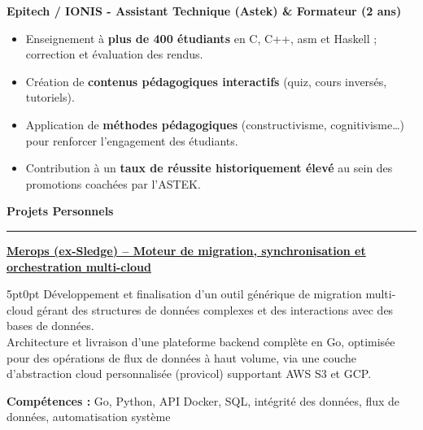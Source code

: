 \documentclass[9pt]{extarticle}
\begin{document}
\par\vspace{5pt}

{\bfseries Epitech / IONIS - Assistant Technique (Astek) \& Formateur (2 ans)}
\begin{itemize}[noitemsep, topsep=0pt]
	\item Enseignement à {\bfseries plus de 400 étudiants} en C, C++, asm et Haskell ; correction et évaluation des rendus.
	\item Création de {\bfseries contenus pédagogiques interactifs} (quiz, cours inversés, tutoriels).
	\item Application de {\bfseries méthodes pédagogiques} (constructivisme, cognitivisme…) pour renforcer l'engagement des étudiants.
	\item Contribution à un {\bfseries taux de réussite historiquement élevé} au sein des promotions coachées par l'ASTEK.
\end{itemize}

\par\vspace{5pt}


{\large\bfseries Projets Personnels}
\par\vspace{-8pt}
\rule{\linewidth}{0.4pt}
\par\vspace{5pt}

\underline{\bfseries Merops (ex-Sledge) -- Moteur de migration, synchronisation et orchestration multi-cloud}
\par
\begin{adjustwidth}{5pt}{0pt}
    Développement et finalisation d'un outil générique de migration multi-cloud gérant des structures de données complexes et des interactions avec des bases de données. \\
    Architecture et livraison d'une plateforme backend complète en Go, optimisée pour des opérations de flux de données à haut volume, via une couche d'abstraction cloud personnalisée ({\ttfamily provicol}) supportant AWS S3 et GCP.
\end{adjustwidth}
\par
{\bfseries Compétences :} Go, Python, API Docker, SQL, intégrité des données, flux de données, automatisation système

\par\vspace{8pt}
\end{document}
